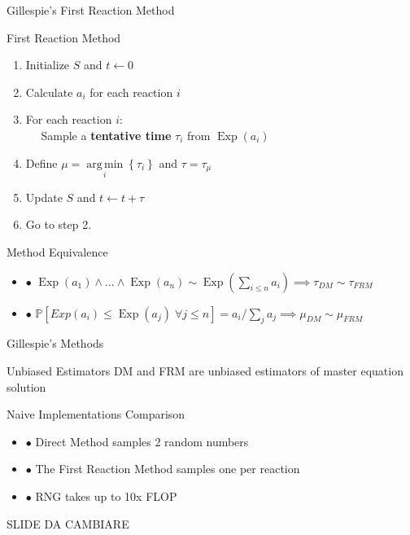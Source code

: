 \documentclass{beamer}
\DeclareMathOperator{\Exp}{\text{Exp}}
\DeclareMathOperator*{\argmin}{arg\,min}
\begin{document}
\begin{frame}{Gillespie's First Reaction Method}
  \begin{block}{First Reaction Method}
    \begin{enumerate}
    \item Initialize $S$ and $t\leftarrow 0$ 
    \item Calculate $a_i$ for each reaction $i$
    \item For each reaction $i$: \\
      $\quad$ Sample a \textbf{tentative time} $\tau_i$ from $\Exp\left(a_i\right)$  
    \item Define $\mu = \argmin\limits_i\left\{\tau_i\right\}$ and $\tau = \tau_\mu$
    \item Update $S$ and $t \leftarrow t + \tau$
    \item Go to step 2.
    \end{enumerate}
  \end{block}
  \begin{block}{Method Equivalence}
    \begin{itemize}
    \item $\bullet$ $\Exp(a_1) \land \dots \land \Exp(a_n) \sim
      \Exp\left(\sum_{i\leq n} a_i\right) \implies \tau_{DM}  \sim \tau_{FRM}$
    \item $\bullet$ $\mathbb{P}\left[Exp(a_i) \leq \Exp(a_j) \;
        \forall j \leq n \right] = a_i \big/\sum_ja_j \implies \mu_{DM} \sim \mu_{FRM}$
    \end{itemize}
  \end{block}
\end{frame}

\begin{frame}{Gillespie's Methods}
  \begin{block}{Unbiased Estimators}
    DM and FRM are unbiased estimators of
    master equation solution

  \end{block}
  \begin{block}{Naive Implementations Comparison}
    \begin{itemize} 
    \item $\bullet$ Direct Method samples 2 random numbers
    \item $\bullet$ The First Reaction Method samples one per reaction 
    \item $\bullet$ RNG takes up to 10x FLOP
    \end{itemize}
  \end{block}
\center \Huge{SLIDE DA CAMBIARE}
\end{frame}
\end{document}
